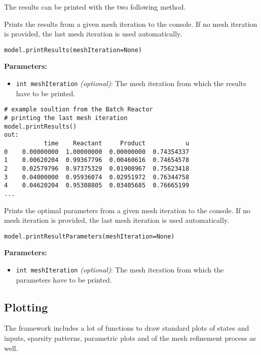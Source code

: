 \documentclass[12pt]{article}
\begin{document}
The results can be printed with the two following method.

\begin{mdframed}[backgroundcolor=gray!10, roundcorner=10pt,
		linewidth=1pt]

	Prints the results from a given mesh iteration to the console. If no
	mesh iteration is provided, the last mesh iteration is used automatically.

	\begin{lstlisting}
model.printResults(meshIteration=None)
		\end{lstlisting}
	\label{printResults}
	\textbf{Parameters:}
	\begin{itemize}
		\item \texttt{int meshIteration} \emph{(optional)}: The mesh
		      iteration from which the results have to be printed.
	\end{itemize}
	\begin{lstlisting}
# example soultion from the Batch Reactor
# printing the last mesh iteration
model.printResults()
out:
           time    Reactant     Product           u
0    0.00000000  1.00000000  0.00000000  0.74354337
1    0.00620204  0.99367796  0.00460616  0.74654578
2    0.02579796  0.97375329  0.01908967  0.75623418
3    0.04000000  0.95936074  0.02951972  0.76344758
4    0.04620204  0.95308805  0.03405685  0.76665199
...
\end{lstlisting}
\end{mdframed}

\begin{mdframed}[backgroundcolor=gray!10, roundcorner=10pt,
		linewidth=1pt]

	Prints the optimal parameters from a given mesh iteration to the
	console. If no mesh iteration is provided, the last mesh iteration is used
	automatically.

	\begin{lstlisting}
model.printResultParameters(meshIteration=None)
		\end{lstlisting}
	\label{printResultParameters}
	\textbf{Parameters:}
	\begin{itemize}
		\item \texttt{int meshIteration} \emph{(optional)}: The mesh
		      iteration from which the parameters have to be printed.
	\end{itemize}

\end{mdframed}

\subsection{Plotting}
\label{c:Plotting}
The framework includes a lot of functions to draw standard plots of states and
inputs, sparsity patterns, parametric plots and of the mesh refinement process
as well.
\end{document}
